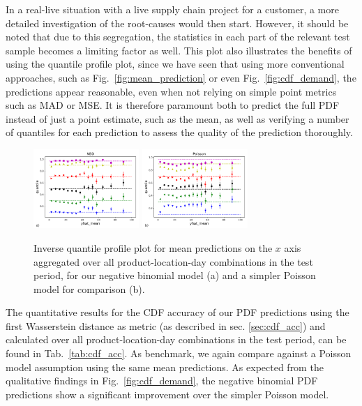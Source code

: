 \documentclass[BCOR=1mm, DIV=calc,10pt,
twoside=true,
twocolumn,
headings=normal]{scrartcl}
\newcommand{\fig}{Fig.~}
\newcommand{\tab}{Tab.~}
\begin{document}
\noindent
In a real-live situation with a live supply chain project for a customer, a more detailed investigation of the root-causes would then start. However, it should be noted that due to this segregation, the statistics in each part of the relevant test sample becomes a limiting factor as well. This plot also illustrates the benefits of using the quantile profile plot, since we have seen that using more conventional approaches, such as \fig \ref{fig:mean_prediction} or even \fig \ref{fig:cdf_demand}, the predictions appear reasonable, even when not relying on simple point metrics such as MAD or MSE. It is therefore paramount both to predict the full PDF instead of just a point estimate, such as the mean, as well as verifying a number of quantiles for each prediction to assess the quality of the prediction thoroughly.

\begin{figure}
\begin{center}
\includegraphics[width=4cm]{figs/invquant_yhat_mean_nbinom}
\includegraphics[width=4cm]{figs/invquant_yhat_mean_poisson}
\caption{\label{fig:invquant_mean} Inverse quantile profile plot for mean predictions on the $x$ axis aggregated over all product-location-day combinations in the test period, for our negative binomial model (a) and a simpler Poisson model for comparison (b).}
\end{center}
\end{figure}

The quantitative results for the CDF accuracy of our PDF predictions using the first Wasserstein distance as metric (as described in sec. \ref{sec:cdf_acc}) and calculated over all product-location-day combinations in the test period, can be found in \tab \ref{tab:cdf_acc}. As benchmark, we again compare against a Poisson model assumption using the same mean predictions. As expected from the qualitative findings in \fig \ref{fig:cdf_demand}, the negative binomial PDF predictions show a significant improvement over the simpler Poisson model.
\end{document}
